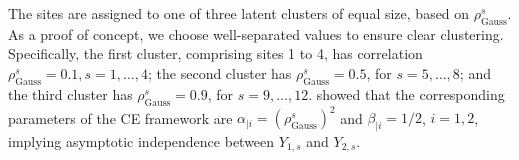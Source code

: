\documentclass[12pt,compact]{article}
\begin{document}
The sites are assigned to one of three latent clusters of equal size, based on $\rho^s_{\text{Gauss}}$.
As a proof of concept, we choose well-separated values to ensure clear clustering.
Specifically, the first cluster, comprising sites 1 to 4, has correlation $\rho_{\text{Gauss}}^s=0.1, s = 1, \ldots, 4$; the second cluster has $\rho_{\text{Gauss}}^s=0.5$, for $s = 5, \ldots, 8$; and the third cluster has $\rho_{\text{Gauss}}^s=0.9$, for $s = 9, \ldots, 12$.
\citet{Keef2013} showed that the corresponding parameters of the CE framework are $\alpha_{\mid i} = (\rho_{\text{Gauss}}^s)^2$ and $\beta_{\mid i} = 1/2$, $i=1,2$, implying asymptotic independence between $Y_{1,s}$ and $Y_{2,s}$.
\end{document}
